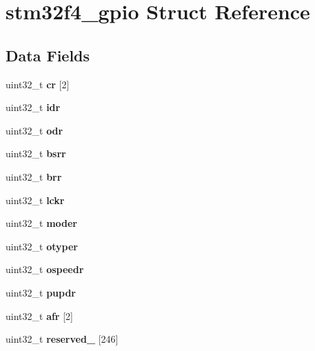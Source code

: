 \hypertarget{structstm32f4__gpio}{}\section{stm32f4\+\_\+gpio Struct Reference}
\label{structstm32f4__gpio}
\subsection*{Data Fields}
\begin{DoxyCompactItemize}
\item 
\mbox{\label{structstm32f4__gpio_ab971d85bb5c6648540f26349ea25138a}} 
uint32\+\_\+t {\bfseries cr} \mbox{[}2\mbox{]}
\item 
\mbox{\label{structstm32f4__gpio_af0f9a6ef4acf02de75eda449228a9ddc}} 
uint32\+\_\+t {\bfseries idr}
\item 
\mbox{\label{structstm32f4__gpio_a48e42cbb235416fb21a4e7b9cede8a75}} 
uint32\+\_\+t {\bfseries odr}
\item 
\mbox{\label{structstm32f4__gpio_adc32475c356edc97b961fecda05351ea}} 
uint32\+\_\+t {\bfseries bsrr}
\item 
\mbox{\label{structstm32f4__gpio_ae52f16555cedab9e761897db1476570d}} 
uint32\+\_\+t {\bfseries brr}
\item 
\mbox{\label{structstm32f4__gpio_aa5778a4dcc7f99968cd63969337e99cc}} 
uint32\+\_\+t {\bfseries lckr}
\item 
\mbox{\label{structstm32f4__gpio_aedb8fd01a0f1c4fcdbdacfabe69627b5}} 
uint32\+\_\+t {\bfseries moder}
\item 
\mbox{\label{structstm32f4__gpio_a1e4cb71fa6b0f7fe6ebe0ee1cb54eba1}} 
uint32\+\_\+t {\bfseries otyper}
\item 
\mbox{\label{structstm32f4__gpio_a1c92a14d58eea78044ced190c0bec469}} 
uint32\+\_\+t {\bfseries ospeedr}
\item 
\mbox{\label{structstm32f4__gpio_ad60b81713d97af63a47a79803ed1fd95}} 
uint32\+\_\+t {\bfseries pupdr}
\item 
\mbox{\label{structstm32f4__gpio_a15ca095a0cf153bb2a347c6fe235fcf1}} 
uint32\+\_\+t {\bfseries afr} \mbox{[}2\mbox{]}
\item 
\mbox{\label{structstm32f4__gpio_a3d2055bf2abd6476de481d5dede47164}} 
uint32\+\_\+t {\bfseries reserved\+\_} \mbox{[}246\mbox{]}
\end{DoxyCompactItemize}


